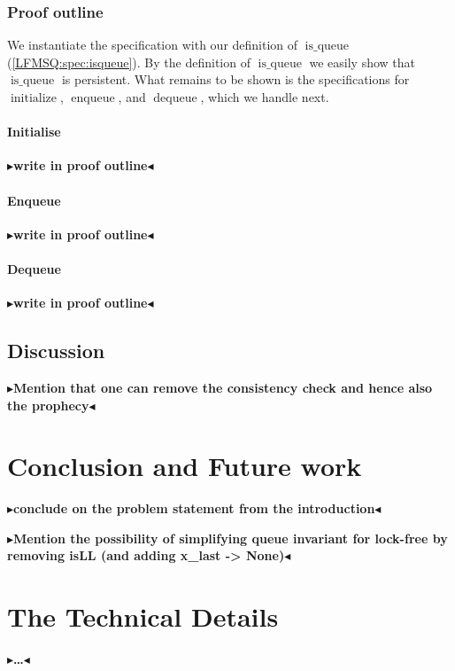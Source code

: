 \documentclass[twoside,11pt,openright]{report}
\newtheorem{definition}{Definition}[section]
\newcommand{\initialise}{\operatorname{initialize}}
\newcommand{\enqueue}{\operatorname{enqueue}}
\newcommand{\dequeue}{\operatorname{dequeue}}
\newcommand{\isqueue}{\operatorname{is\_queue}}
\newcommand{\todo}[1]{{\color[rgb]{.5,0,0}\textbf{$\blacktriangleright$#1$\blacktriangleleft$}}}
\begin{document}
\subsection{Proof outline}

We instantiate the specification with our definition of $\isqueue$ (\ref{LFMSQ:spec:isqueue}). By the definition of $\isqueue$ we easily show that $\isqueue$ is persistent. What remains to be shown is the specifications for $\initialise$, $\enqueue$, and $\dequeue$, which we handle next.

\subsubsection{Initialise}
\todo{write in proof outline}

\subsubsection{Enqueue}
\todo{write in proof outline}

\subsubsection{Dequeue}
\todo{write in proof outline}


\section{Discussion}
\label{LFMSQ:discussion}

\todo{Mention that one can remove the consistency check and hence also the prophecy}


\chapter{Conclusion and Future work}
\label{ch:conclusion_fw}

\todo{conclude on the problem statement from the introduction}

\todo{Mention the possibility of simplifying queue invariant for lock-free by removing isLL (and adding x\_last -> None)}


\cleardoublepage
{}




\cleardoublepage
\appendix
\chapter{The Technical Details}


\todo{\dots}
\end{document}
